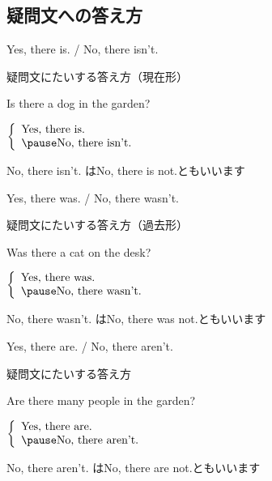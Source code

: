 \documentclass[aspectratio=169,xcolor={dvipsnames,table}]{beamer}
\newcommand{\myaudio}[1]{\href{#1}{\faVolumeUp}}
\begin{document}
\subsection{疑問文への答え方}
 \begin{frame}[plain]{Yes, there is. / No, there isn't.}
 \Large

疑問文にたいする答え方（現在形）\hfill\myaudio{./audio/001_there_is_09.mp3}
\vspace{10pt}

\pause

Is there a dog in the garden?

\pause

$\left\{\begin{array}{l}
	 \text{Yes, there is.}\\\pause
         \text{No, there isn't.}
	\end{array}\right.$

\pause

\mbox{}\hfill{}{\small No, there isn't. はNo, there is not.ともいいます}
\end{frame}
 \begin{frame}[plain]{Yes, there was. / No, there wasn't.}
 \Large

疑問文にたいする答え方（過去形）\hfill\myaudio{./audio/001_there_is_10.mp3}
\vspace{10pt}

\pause
Was there a cat on the desk?

\pause

$\left\{\begin{array}{l}
	 \text{Yes, there was.}\\\pause
         \text{No, there wasn't.}
	\end{array}\right.$

\pause

\mbox{}\hfill{}{\small No, there wasn't. はNo, there was not.ともいいます}
\end{frame}
 \begin{frame}[plain]{Yes, there are. / No, there aren't.}
 \Large

疑問文にたいする答え方\hfill\myaudio{./audio/001_there_is_11.mp3}
\vspace{10pt}

\pause

Are there many people in the garden?

\pause 

$\left\{\begin{array}{l}
	 \text{Yes, there are.}\\\pause
         \text{No, there aren't.}
	\end{array}\right.$

\pause

\mbox{}\hfill{}{\small No, there aren't. はNo, there are not.ともいいます}
\end{frame}
\end{document}
